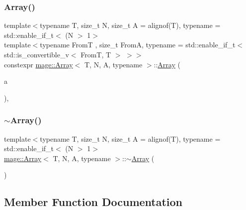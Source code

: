 \subsubsection{\texorpdfstring{Array()}{Array()}\hspace{0.1cm}{\footnotesize\ttfamily [10/10]}}
{\footnotesize\ttfamily template$<$typename T, size\+\_\+t N, size\+\_\+t A = alignof(\+T), typename  = std\+::enable\+\_\+if\+\_\+t$<$ (\+N $>$ 1$>$ \\
template$<$typename FromT , size\+\_\+t FromA, typename  = std\+::enable\+\_\+if\+\_\+t$<$ std\+::is\+\_\+convertible\+\_\+v$<$ From\+T, T $>$ $>$$>$ \\
constexpr \mbox{\hyperlink{structmage_1_1_array}{mage\+::\+Array}}$<$ T, N, A, typename $>$\+::\mbox{\hyperlink{structmage_1_1_array}{Array}} (\begin{DoxyParamCaption}\item[{const \mbox{\hyperlink{structmage_1_1_array}{Array}}$<$ FromT, N, FromA $>$ \&}]{a }\end{DoxyParamCaption})\hspace{0.3cm}{\ttfamily [explicit]}, {\ttfamily [noexcept]}}

\mbox{\label{structmage_1_1_array_a7adc09166915789b93a7a3af118182e0}} 
\subsubsection{\texorpdfstring{$\sim$\+Array()}{~Array()}}
{\footnotesize\ttfamily template$<$typename T, size\+\_\+t N, size\+\_\+t A = alignof(\+T), typename  = std\+::enable\+\_\+if\+\_\+t$<$ (\+N $>$ 1$>$ \\
\mbox{\hyperlink{structmage_1_1_array}{mage\+::\+Array}}$<$ T, N, A, typename $>$\+::$\sim$\mbox{\hyperlink{structmage_1_1_array}{Array}} (\begin{DoxyParamCaption}{ }\end{DoxyParamCaption})\hspace{0.3cm}{\ttfamily [default]}}



\subsection{Member Function Documentation}
\mbox{\label{structmage_1_1_array_a216d8efaf044c3219a45e53073833ee0}} 
